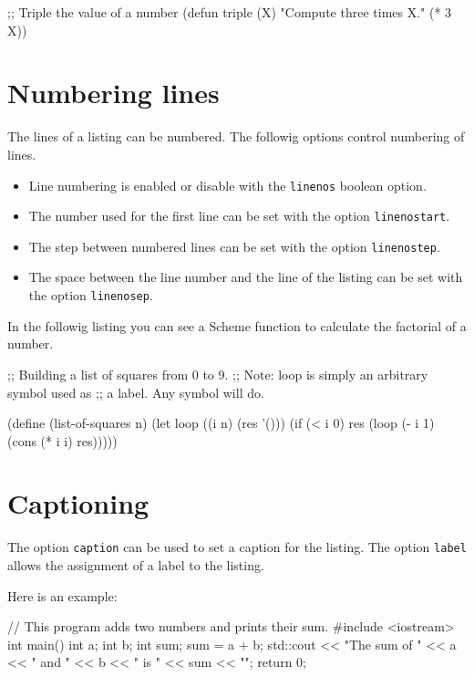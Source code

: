 \documentclass[10pt,a4paper]{article}
\begin{document}
\begin{pygmented}[lang=common-lisp,tabsize=4]
;; Triple the value of a number
(defun triple	(X)
	"Compute three times X."
	(* 3 X))
\end{pygmented}


\section{Numbering lines}

The lines of a listing can be numbered. The followig options control
numbering of lines.
\begin{itemize}
  \item Line numbering is enabled or disable with the \verb|linenos|
  boolean option.
  \item The number used for the first line can be set with the option
  \verb|linenostart|.
  \item The step between numbered lines can be set with the option
  \verb|linenostep|.
  \item The space between the line number and the line of the listing
  can be set with the option \verb|linenosep|.
\end{itemize}

In the followig listing you can see a Scheme function to calculate the
factorial of a number.

\begin{Example}
\begin{pygmented}[lang=scheme,linenos,linenostart=1001,linenostep=2,linenosep=5mm]
;; Building a list of squares from 0 to 9.
;; Note: loop is simply an arbitrary symbol used as
;; a label. Any symbol will do.
 
(define (list-of-squares n)
  (let loop ((i n) (res '()))
    (if (< i 0)
        res
        (loop (- i 1) (cons (* i i) res)))))
\end{pygmented}
\end{Example}

\section{Captioning}

The option \verb|caption| can be used to set a caption for the listing.
The option \verb|label| allows the assignment of a label to the listing.

Here is an example:

\begin{Example}
\begin{pygmented}[lang=c++,label=lst:test,caption=A \textbf{C++} example]
// This program adds two numbers and prints their sum.
#include <iostream>
int main()
{
  int a;
  int b;
  int sum;
  sum = a + b;
  std::cout << "The sum of " << a << " and " << b
            << " is " << sum << "\n";
  return 0;
}
\end{pygmented}
\end{Example}
\end{document}
